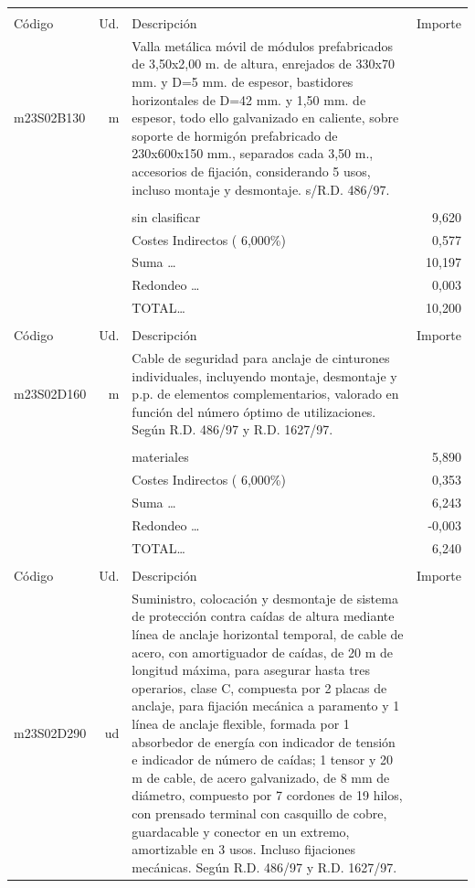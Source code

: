 \begin{supertabular}{l r p{60mm} r}
&&&\\%
Código&Ud.&Descripción&Importe\\%
\hline%
m23S02B130&m&Valla metálica móvil de módulos prefabricados de 3,50x2,00 m. de altura, enrejados de 330x70 mm. y D=5 mm. de espesor, bastidores horizontales de D=42 mm. y 1,50 mm. de espesor, todo ello galvanizado en caliente, sobre soporte de hormigón prefabricado de 230x600x150 mm., separados cada 3,50 m., accesorios de fijación, considerando 5 usos, incluso montaje y desmontaje. s/R.D. 486/97.&\\%
&&&\\%
&&sin clasificar&     9,620\\%
&&Costes Indirectos (     6,000\%)&     0,577\\%
&&Suma \ldots&    10,197\\%
&&Redondeo \ldots&     0,003\\%
%
&&TOTAL\ldots&    10,200\\%
&&&\\%
Código&Ud.&Descripción&Importe\\%
\hline%
m23S02D160&m&Cable de seguridad para anclaje de cinturones individuales, incluyendo montaje, desmontaje y p.p. de elementos complementarios, valorado en función del número óptimo de utilizaciones. Según R.D. 486/97 y R.D. 1627/97.&\\%
&&&\\%
&&materiales&     5,890\\%
&&Costes Indirectos (     6,000\%)&     0,353\\%
&&Suma \ldots&     6,243\\%
&&Redondeo \ldots&    {-}0,003\\%
%
&&TOTAL\ldots&     6,240\\%
&&&\\%
Código&Ud.&Descripción&Importe\\%
\hline%
m23S02D290&ud&Suministro, colocación y desmontaje de sistema de protección contra caídas de altura mediante línea de anclaje horizontal temporal, de cable de acero, con amortiguador de caídas, de 20 m de longitud máxima, para asegurar hasta tres operarios, clase C, compuesta por 2 placas de anclaje, para fijación mecánica a paramento y 1 línea de anclaje flexible, formada por 1 absorbedor de energía con indicador de tensión e indicador de número de caídas; 1 tensor y 20 m de cable, de acero galvanizado, de 8 mm de diámetro, compuesto por 7 cordones de 19 hilos, con prensado terminal con casquillo de cobre, guardacable y conector en un extremo, amortizable en 3 usos. Incluso fijaciones mecánicas. Según R.D. 486/97 y R.D. 1627/97.&\\%

\end{supertabular}
